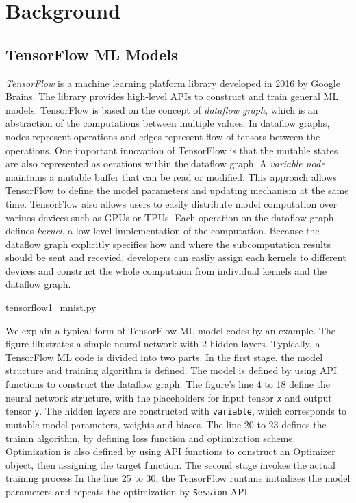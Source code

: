 \section{Background}\label{sec:background}
\subsection{TensorFlow ML Models}

\textit{TensorFlow}\cite{tensorflow} is a machine learning platform library
developed in 2016 by Google Brains.
The library provides high-level APIs to construct and train general ML models.
TensorFlow is based on the concept of \textit{dataflow graph},
which is an abstraction of the computations between
multiple values.
In dataflow graphs, nodes represent operations and
edges represent flow of tensors between the operations.
One important innovation of TensorFlow
is that the mutable states are also represented as oerations
within the dataflow graph. 
A \textit{variable node} maintains a mutable buffer that can be read or modified.
This approach allows TensorFlow to define the model parameters
and updating mechanism at the same time.
TensorFlow also allows users to easily distribute model computation over
variuos devices such as GPUs or TPUs.
Each operation on the dataflow graph defines \textit{kernel},
a low-level implementation of the computation.
Because the dataflow graph explicitly specifies how
and where the subcomputation results should be sent and recevied,
developers can easliy assign each kernels to different devices and construct
the whole computaion from individual kernels and the dataflow graph.


{tensorflow1_mnist.py}

We explain a typical form of TensorFlow ML model codes by an example.
The figure illustrates a simple neural network with 2 hidden layers.
Typically, a TensorFlow ML code is divided into two parts.
In the first stage, the model structure and training algorithm is defined.
The model is defined by using API functions to construct the dataflow graph.
The figure's line 4 to 18 define the neural network structure,
with the placeholders for input tensor {\tt x} and output tensor {\tt y}.
The hidden layers are constructed with {\tt variable},
which corresponds to mutable model parameters, weights and biases.  
The line 20 to 23 defines the trainin algorithm, 
by defining loss function and optimization scheme.
Optimization is also defined by using API functions to construct
an Optimizer object, then assigning the target function.
The second stage invokes the actual training process
In the line 25 to 30, the TensorFlow runtime initializes the model parameters
and repeats the optimization by {\tt Session} API. 

